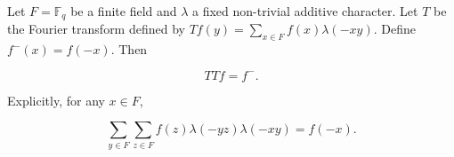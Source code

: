 Let $F = \mathbb{F}_q$ be a finite field and $\lambda$ a fixed non-trivial additive character. Let $T$ be the Fourier transform defined by $Tf(y) = \sum_{x \in F} f(x)\lambda(-xy)$. Define $f^{-}(x) = f(-x)$. Then

$$TTf = f^{-}.$$

Explicitly, for any $x \in F$,

$$\sum_{y \in F} \sum_{z \in F} f(z) \lambda(-yz) \lambda(-xy) = f(-x).$$
